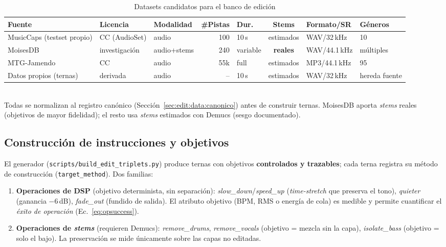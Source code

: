 \begin{table}[t]
  \caption{Datasets candidatos para el banco de edición}
  \label{tab:edit-datasets}
  \centering
  \small
  \begin{tabular}{lllrlcll}
    \hline
    \textbf{Fuente} & \textbf{Licencia} & \textbf{Modalidad} & \textbf{\#Pistas} &
    \textbf{Dur.} & \textbf{Stems} & \textbf{Formato/SR} & \textbf{Géneros} \\
    \hline
    MusicCaps (testset propio) & CC (AudioSet) & audio   & 100  & 10\,s  & estimados & WAV/32\,kHz & 10 \\
    MoisesDB                   & investigación & audio+stems & 240  & variable & \textbf{reales} & WAV/44.1\,kHz & múltiples \\
    MTG-Jamendo                & CC            & audio   & 55k  & full   & estimados & MP3/44.1\,kHz & 95 \\
    Datos propios (ternas)     & derivada      & audio   & --   & 10\,s  & estimados & WAV/32\,kHz & hereda fuente \\
    \hline
  \end{tabular}
  \smallskip\\
  \footnotesize{Todas se normalizan al registro canónico
  (Sección~\ref{sec:edit:data:canonico}) antes de construir ternas. MoisesDB
  aporta \textit{stems} reales (objetivos de mayor fidelidad); el resto usa
  \textit{stems} estimados con Demucs (sesgo documentado).}
\end{table}

\subsection{Construcción de instrucciones y objetivos}
\label{sec:edit:data:construccion}

El generador (\texttt{scripts/build\_edit\_triplets.py}) produce ternas con
objetivos \textbf{controlados y trazables}; cada terna registra su método de
construcción (\texttt{target\_method}). Dos familias:

\begin{enumerate}
  \item \textbf{Operaciones de DSP} (objetivo determinista, sin separación):
        \textit{slow\_down}/\textit{speed\_up} (\textit{time-stretch} que
        preserva el tono), \textit{quieter} (ganancia $-6$\,dB),
        \textit{fade\_out} (fundido de salida). El atributo objetivo (BPM, RMS o
        energía de cola) es medible y permite cuantificar el \emph{éxito de
        operación} (Ec.~\ref{eq:opsuccess}).
  \item \textbf{Operaciones de \textit{stems}} (requieren Demucs):
        \textit{remove\_drums}, \textit{remove\_vocals} (objetivo = mezcla sin la
        capa), \textit{isolate\_bass} (objetivo = solo el bajo). La preservación
        se mide únicamente sobre las capas no editadas.
\end{enumerate}

